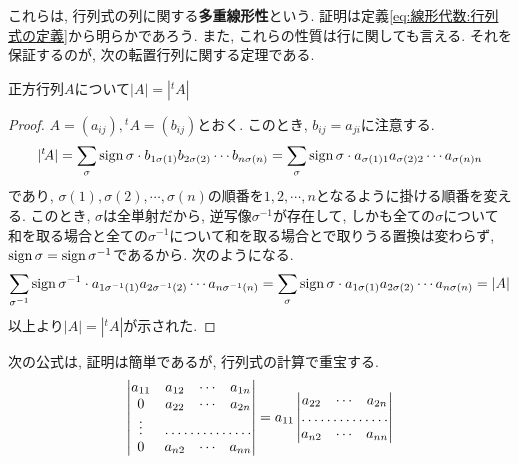         これらは, 行列式の列に関する\textbf{多重線形性}という. 証明は定義\eqref{eq:線形代数:行列式の定義}から明らかであろう.
        また, これらの性質は行に関しても言える. それを保証するのが, 次の転置行列に関する定理である.
        \begin{screen}
            正方行列$A$について$|A|=|{}^t\!A|$
        \end{screen}
        \begin{proof}
            $A=(a_{ij}),{}^t\!A=(b_{ij})$とおく. このとき, $b_{ij}=a_{ji}$に注意する.
            \begin{equation*}
                |{}^t\!A|=\sum_{\sigma} \mathop{\mathrm{sign}}\nolimits\sigma\cdot b_{1\sigma(1)}b_{2\sigma(2)}\cdots b_{n\sigma(n)}=\sum_{\sigma} \mathop{\mathrm{sign}}\nolimits\sigma\cdot a_{\sigma(1)1}a_{\sigma(2)2}\cdots a_{\sigma(n)n}
            \end{equation*}
            であり, $\sigma(1),\sigma(2),\cdots,\sigma(n)$の順番を$1,2,\cdots,n$となるように掛ける順番を変える.  
            このとき, $\sigma$は全単射だから, 逆写像$\sigma^{-1}$が存在して, しかも全ての$\sigma$について和を取る場合と全ての$\sigma^{-1}$について和を取る場合とで取りうる置換は変わらず, $\mathop{\mathrm{sign}}\nolimits\sigma=\mathop{\mathrm{sign}}\nolimits\sigma^{-1}$であるから.
            次のようになる.
            \begin{equation*}
                \sum_{\sigma^{-1}} \mathop{\mathrm{sign}}\nolimits\sigma^{-1}\cdot a_{1\sigma^{-1}(1)}a_{2\sigma^{-1}(2)}\cdots a_{n\sigma^{-1}(n)}=\sum_{\sigma} \mathop{\mathrm{sign}}\nolimits\sigma\cdot a_{1\sigma(1)}a_{2\sigma(2)}\cdots a_{n\sigma(n)}=|A|
            \end{equation*}
            以上より$|A|=|{}^t\!A|$が示された.
        \end{proof}
        \clearpage
        次の公式は, 証明は簡単であるが, 行列式の計算で重宝する.
        \begin{equation}
            \begin{vmatrix}
                a_{11} & a_{12} & \cdots & a_{1n}\\
                0 & a_{22} & \cdots & a_{2n}\\
                \vdots & \hdotsfor{3}\\
                0 & a_{n2} & \cdots & a_{nn}
            \end{vmatrix}
            =a_{11}\begin{vmatrix}
                a_{22} & \cdots & a_{2n}\\
                \hdotsfor{3}\\
                a_{n2} & \cdots & a_{nn}
            \end{vmatrix} \label{eq:線形代数:行列式の簡単化}
        \end{equation}
